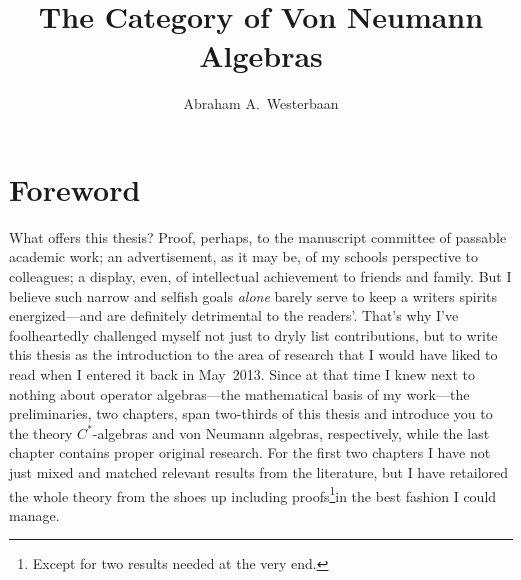 \documentclass[b5paper]{book}
\begin{document}
\title{%
\sffamily\color{darkblue}%
The Category of Von Neumann Algebras}
\author{Abraham A.~Westerbaan}
\maketitle

\makeatletter{}\makeatother

\chapter{Foreword}

\begin{parsec}
	\begin{point}
What offers this thesis?
Proof, perhaps,
to the manuscript committee
of passable academic work;
an advertisement, as it may be,
of my schools perspective
to colleagues;
a display, even,
of intellectual achievement
to friends and family.
But I believe such narrow and selfish goals \emph{alone}
barely serve to keep a writers spirits 
energized---and are definitely detrimental to the readers'.
That's why I've foolheartedly
challenged
myself
not just 
to dryly list contributions,
but to write this thesis
as the introduction
to the  area of research
that I would have liked to read
when I entered it back in May~2013.
Since at that time
I knew next to nothing 
about operator algebras---the mathematical basis
of my work---the preliminaries,
two chapters,
span two-thirds
of this thesis
and introduce you
to the theory  $C^*$-algebras
and von Neumann algebras,
respectively,
while the last chapter
contains proper original research.
For the first
two chapters I have not just mixed
and matched
relevant results from the literature,
but I have retailored the 
whole theory
from the shoes up
including proofs\footnote{Except for two results needed
at the very end.}in the best fashion
I could manage.

	\end{point}
\end{parsec}

% 




\backmatter

\fancyfoot[CE]{}
\fancyfoot[CO]{}

\printindex

{}

\end{document}
